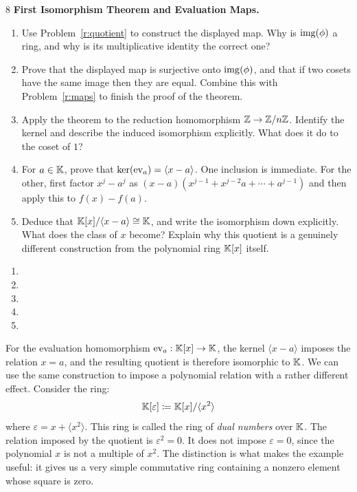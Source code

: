 \documentclass[Notebook.tex]{subfiles}
\begin{document}
\hrulefill

\begin{problem}{8}\label{r:fit}
	\textbf{First Isomorphism Theorem and Evaluation Maps.}
	\begin{enumerate}[label=(\alph*),ref=\theenumi\alph*]
		\item Use Problem~\ref{r:quotient} to construct the displayed map. Why is $\operatorname{img}(\phi)$ a ring, and why is its multiplicative identity the correct one?
		\item Prove that the displayed map is surjective onto $\operatorname{img}(\phi)$, and that if two cosets have the same image then they are equal. Combine this with Problem~\ref{r:maps} to finish the proof of the theorem.
		\item Apply the theorem to the reduction homomorphism $\mathbb Z\to\mathbb Z/n\mathbb Z$. Identify the kernel and describe the induced isomorphism explicitly. What does it do to the coset of $1$?
		\item For $a\in\mathbb K$, prove that $\ker(\operatorname{ev}_a)=\langle x-a\rangle$. One inclusion is immediate. For the other, first factor $x^j-a^j$ as $(x-a)(x^{j-1}+x^{j-2}a+\cdots+a^{j-1})$ and then apply this to $f(x)-f(a)$.
		\item Deduce that $\mathbb K[x]/\langle x-a\rangle\cong\mathbb K$, and write the isomorphism down explicitly. What does the class of $x$ become? Explain why this quotient is a genuinely different construction from the polynomial ring $\mathbb K[x]$ itself.
	\end{enumerate}
\end{problem}

\begin{solution}
	\bbni
	\begin{enumerate}[label=(\alph*),ref=\theenumi\alph*]
		\item
		\item
		\item
		\item
		\item
	\end{enumerate}
\end{solution}

\newpage

For the evaluation homomorphism $\operatorname{ev}_a:\mathbb K[x]\to\mathbb K$, the kernel $\langle x-a\rangle$ imposes the relation $x=a$, and the resulting quotient is therefore isomorphic to $\mathbb K$. We can use the same construction to impose a polynomial relation with a rather different effect. Consider the ring:
\[
\mathbb K[\varepsilon]\coloneqq \mathbb K[x]/\langle x^2\rangle
\]
where $\varepsilon = x+\langle x^2\rangle$. This ring is called the ring of \emph{dual numbers} over $\mathbb K$. The relation imposed by the quotient is $\varepsilon^2=0$. It does not impose $\varepsilon=0$, since the polynomial $x$ is not a multiple of $x^2$. The distinction is what makes the example useful: it gives us a very simple commutative ring containing a nonzero element whose square is zero.
\end{document}
